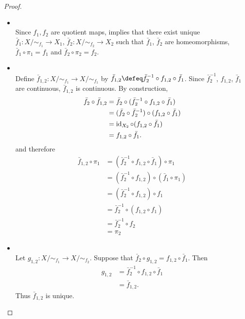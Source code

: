\documentclass{book}
\begin{document}
	\begin{proof}\
		\begin{itemize}
			\item {} \\
			Since $f_1,f_2$ are quotient maps,  implies that there exist unique $\bar{f}_1: X/{\sim_{f_1}} \rightarrow X_1$, $\bar{f}_2:X/{\sim_{f_2}} \rightarrow X_2$ such that $\bar{f}_1$, $\bar{f}_2$ are homeomorphisms, $\bar{f}_1 \circ \pi_1 = f_1$ and $\bar{f}_2 \circ \pi_2 = f_2$.
			\item \tbf{Existence of $\bar{f}_{1,2}$:} \\
			Define $\bar{f}_{1,2}:X/{\sim_{f_1}} \rightarrow X/{\sim_{f_1}}$ by $\bar{f}_{1,2} \defeq \bar{f}_2^{-1} \circ f_{1,2} \circ \bar{f}_1$. Since $\bar{f}_2^{-1}$, $f_{1,2}$, $\bar{f}_1$ are continuous, $\bar{f}_{1,2}$ is continuous. By construction,
			\begin{align*}
				\bar{f}_2 \circ \bar{f}_{1,2} 
				& =  \bar{f}_2 \circ (\bar{f}_2^{-1} \circ f_{1,2} \circ \bar{f}_1) \\
				& = (\bar{f}_2 \circ \bar{f}_2^{-1}) \circ (f_{1,2} \circ \bar{f}_1) \\
				& = \operatorname{id}_{X_2} \circ (f_{1,2} \circ \bar{f}_1) \\
				& = f_{1,2} \circ \bar{f}_1. 
			\end{align*}
			and therefore
			\begin{align*}
				\bar{f}_{1,2} \circ \pi_1 
				& = (\bar{f}_2^{-1} \circ f_{1,2} \circ \bar{f}_1) \circ \pi_1 \\
				& = (\bar{f}_2^{-1} \circ f_{1,2}) \circ (\bar{f}_1 \circ \pi_1) \\
				& = (\bar{f}_2^{-1} \circ f_{1,2}) \circ f_1 \\
				& = \bar{f}_2^{-1} \circ (f_{1,2} \circ f_1) \\
				& = \bar{f}_2^{-1} \circ f_2 \\
				& = \pi_2 
			\end{align*}
			\item {} \\
			Let $g_{1,2}: X/{\sim_{f_1}} \rightarrow X/{\sim_{f_2}}$. Suppose that $\bar{f}_2 \circ g_{1,2} = f_{1,2} \circ \bar{f}_1$. Then 
			\begin{align*}
				g_{1,2}
				& = \bar{f}_2^{-1} \circ f_{1,2} \circ \bar{f}_1 \\
				& = \bar{f}_{1,2}.
			\end{align*}
			Thus $\bar{f}_{1,2}$ is unique.
		\end{itemize}
	\end{proof}
\end{document}
